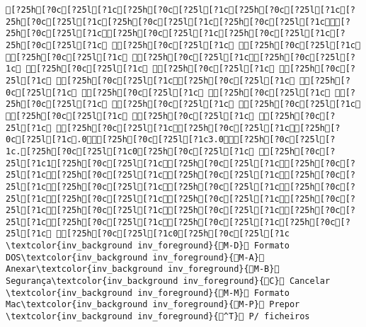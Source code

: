 \documentclass{scrartcl}
\begin{document}
\begin{Verbatim}
[?25h[?0c[?25l[?1c[?25h[?0c[?25l[?1c[?25h[?0c[?25l[?1c[?25h[?0c[?25l[?1c[?25h[?0c[?25l[?1c[?25h[?0c[?25l[?1c[?25h[?0c[?25l[?1c[?25h[?0c[?25l[?1c[?25h[?0c[?25l[?1c[?25h[?0c[?25l[?1c [?25h[?0c[?25l[?1c [?25h[?0c[?25l[?1c [?25h[?0c[?25l[?1c [?25h[?0c[?25l[?1c[?25h[?0c[?25l[?1c [?25h[?0c[?25l[?1c [?25h[?0c[?25l[?1c [?25h[?0c[?25l[?1c [?25h[?0c[?25l[?1c[?25h[?0c[?25l[?1c [?25h[?0c[?25l[?1c [?25h[?0c[?25l[?1c [?25h[?0c[?25l[?1c [?25h[?0c[?25l[?1c [?25h[?0c[?25l[?1c [?25h[?0c[?25l[?1c [?25h[?0c[?25l[?1c [?25h[?0c[?25l[?1c [?25h[?0c[?25l[?1c [?25h[?0c[?25l[?1c[?25h[?0c[?25l[?1c[?25h[?0c[?25l[?1c.0[?25h[?0c[?25l[?1c3.0[?25h[?0c[?25l[?1c.[?25h[?0c[?25l[?1c0[?25h[?0c[?25l[?1c [?25h[?0c[?25l[?1c1[?25h[?0c[?25l[?1c[?25h[?0c[?25l[?1c[?25h[?0c[?25l[?1c[?25h[?0c[?25l[?1c[?25h[?0c[?25l[?1c[?25h[?0c[?25l[?1c[?25h[?0c[?25l[?1c[?25h[?0c[?25l[?1c[?25h[?0c[?25l[?1c[?25h[?0c[?25l[?1c[?25h[?0c[?25l[?1c[?25h[?0c[?25l[?1c[?25h[?0c[?25l[?1c[?25h[?0c[?25l[?1c[?25h[?0c[?25l[?1c[?25h[?0c[?25l[?1c[?25h[?0c[?25l[?1c[?25h[?0c[?25l[?1c [?25h[?0c[?25l[?1c0[?25h[?0c[?25l[?1c                      \textcolor{inv_background inv_foreground}{M-D} Formato DOS\textcolor{inv_background inv_foreground}{M-A} Anexar\textcolor{inv_background inv_foreground}{M-B} Segurança\textcolor{inv_background inv_foreground}{C} Cancelar                        \textcolor{inv_background inv_foreground}{M-M} Formato Mac\textcolor{inv_background inv_foreground}{M-P} Prepor         \textcolor{inv_background inv_foreground}{^T} P/ ficheiros

\end{Verbatim}
\end{document}
